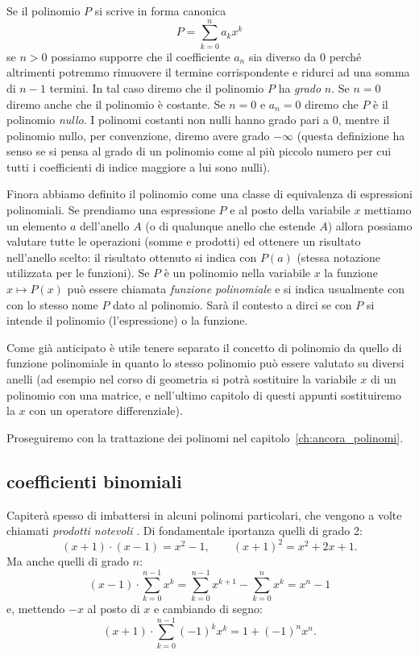 Se il polinomio $P$ si scrive in forma canonica
\[
  P = \sum_{k=0}^n a_k x^k
\]
se $n>0$ possiamo supporre che il coefficiente $a_n$ sia diverso da $0$ 
perché altrimenti potremmo rimuovere il termine corrispondente e ridurci 
ad una somma di $n-1$ termini. 
In tal caso diremo che il polinomio $P$ ha \emph{grado}%
%
 $n$.
%
% 
Se $n=0$ diremo anche che il polinomio è costante.
Se $n=0$ e $a_n=0$ diremo che $P$ è il polinomio \emph{nullo}.
I polinomi costanti non nulli hanno grado pari a $0$, mentre il polinomio nullo, 
per convenzione, diremo avere grado $-\infty$ (questa definizione ha senso se si pensa 
al grado di un polinomio come al più piccolo numero per cui tutti i coefficienti di
indice maggiore a lui sono nulli).

Finora abbiamo definito il polinomio come una classe di equivalenza di 
espressioni polinomiali. 
Se prendiamo una espressione $P$ e al posto della variabile $x$ 
mettiamo un elemento $a$ dell'anello $A$ (o di qualunque anello che estende 
$A$) allora possiamo valutare tutte le operazioni (somme e prodotti) ed 
ottenere un risultato nell'anello scelto: il risultato 
ottenuto si indica con $P(a)$ (stessa notazione utilizzata per le funzioni).
Se $P$ è un polinomio nella variabile $x$ la funzione $x\mapsto P(x)$ 
può essere chiamata \emph{funzione polinomiale}%
%
 e si indica usualmente 
con con lo stesso nome $P$ dato al polinomio. Sarà il contesto a dirci 
se con $P$ si intende il polinomio (l'espressione) o la funzione.

Come già anticipato è utile tenere separato il concetto di polinomio da quello di 
funzione polinomiale in quanto lo stesso polinomio può essere valutato su diversi 
anelli (ad esempio nel corso di geometria si potrà sostituire
la variabile $x$ di un polinomio con una matrice, 
e nell'ultimo capitolo di questi appunti 
sostituiremo la $x$ con un operatore differenziale).

Proseguiremo con la trattazione dei polinomi 
nel capitolo~\ref{ch:ancora_polinomi}.

\subsection{coefficienti binomiali}
\label{ch:binomiale}

Capiterà spesso di imbattersi in alcuni polinomi particolari, che vengono 
a volte chiamati \emph{prodotti notevoli}%
%
. 
Di fondamentale iportanza quelli di grado 2:
\[
  (x+1)\cdot(x-1) = x^2-1, \qquad (x+1)^2 = x^2+2x + 1.
\]
Ma anche quelli di grado $n$:
\[
  (x-1)\cdot \sum_{k=0}^{n-1} x^k
  = \sum_{k=0}^{n-1} x^{k+1} - \sum_{k=0}^n x^k = x^n - 1
\]
e, mettendo $-x$ al posto di $x$ e cambiando di segno:
\[
  (x+1)\cdot \sum_{k=0}^{n-1} (-1)^k x^k
  = 1 + (-1)^n x^n.
\]

